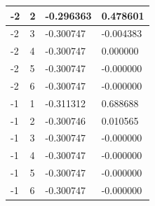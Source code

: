 \documentclass[a4paper, 11pt]{article}
\begin{document}
\begin{table}[H]
\begin{tabular}{|l|l|l|l|}
-2 & 2 & -0.296363 & 0.478601 \\ \hline
-2 & 3 & -0.300747 & -0.004383 \\ \hline
-2 & 4 & -0.300747 & 0.000000 \\ \hline
-2 & 5 & -0.300747 & -0.000000 \\ \hline
-2 & 6 & -0.300747 & -0.000000 \\ \hline
-1 & 1 & -0.311312 & 0.688688 \\ \hline
-1 & 2 & -0.300746 & 0.010565 \\ \hline
-1 & 3 & -0.300747 & -0.000000 \\ \hline
-1 & 4 & -0.300747 & -0.000000 \\ \hline
-1 & 5 & -0.300747 & -0.000000 \\ \hline
-1 & 6 & -0.300747 & -0.000000 \\ \hline
\end{tabular}
\end{table}
\end{document}
